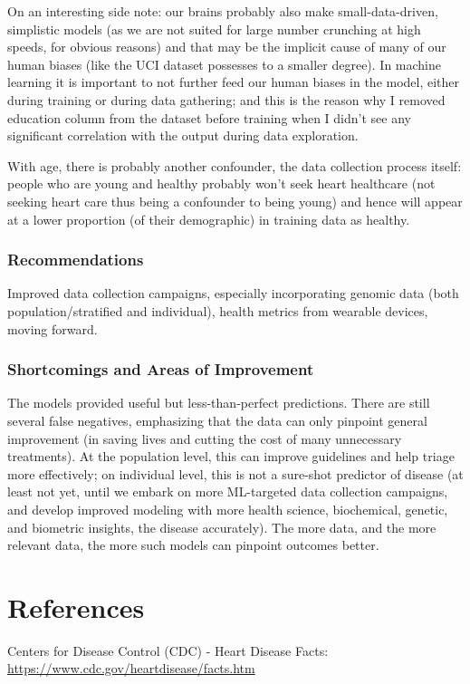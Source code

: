 \documentclass[]{article}
\begin{document}
On an interesting side note: our brains probably also make
small-data-driven, simplistic models (as we are not suited for large
number crunching at high speeds, for obvious reasons) and that may be
the implicit cause of many of our human biases (like the UCI dataset
possesses to a smaller degree). In machine learning it is important to
not further feed our human biases in the model, either during training
or during data gathering; and this is the reason why I removed education
column from the dataset before training when I didn't see any
significant correlation with the output during data exploration.

With age, there is probably another confounder, the data collection
process itself: people who are young and healthy probably won't seek
heart healthcare (not seeking heart care thus being a confounder to
being young) and hence will appear at a lower proportion (of their
demographic) in training data as healthy.

\subsubsection{Recommendations}\label{recommendations}

Improved data collection campaigns, especially incorporating genomic
data (both population/stratified and individual), health metrics from
wearable devices, moving forward.

\subsubsection{Shortcomings and Areas of
Improvement}\label{shortcomings-and-areas-of-improvement}

The models provided useful but less-than-perfect predictions. There are
still several false negatives, emphasizing that the data can only
pinpoint general improvement (in saving lives and cutting the cost of
many unnecessary treatments). At the population level, this can improve
guidelines and help triage more effectively; on individual level, this
is not a sure-shot predictor of disease (at least not yet, until we
embark on more ML-targeted data collection campaigns, and develop
improved modeling with more health science, biochemical, genetic, and
biometric insights, the disease accurately). The more data, and the more
relevant data, the more such models can pinpoint outcomes better.

\section{References}\label{references}

Centers for Disease Control (CDC) - Heart Disease Facts:
\url{https://www.cdc.gov/heartdisease/facts.htm}
\end{document}
